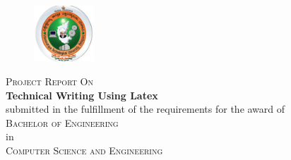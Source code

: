 \documentclass{article}
\begin{document}
	\begin{titlepage}
		\\
		\vspace{0.5cm}
		\begin{figure}[htbp]
					\centering\includegraphics[width=0.2\textwidth]{vtu.jpeg}\par
		\end{figure}
		
			\centering	\textsc{\scshape{Project Report On}}\\
			\centering	\textbf{Technical Writing Using Latex}\\
			submitted in the fulfillment of the requirements for the award of\\
			\vspace{0.1cm}
			\centering\textsc{Bachelor of Engineering }\\in\\\centering\textsc{Computer Science and Engineering} \\
			\vspace*{0.1cm}
			\\
			\vspace{1cm}
			

\end{titlepage}
\end{document}

